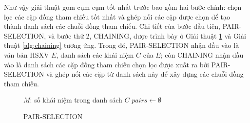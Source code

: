 Như vậy giải thuật gom cụm cụm tốt nhất trước bao gồm hai bước chính: chọn lọc các cặp đồng tham chiếu tốt nhất và ghép nối các cặp được chọn để tạo thành danh sách các chuỗi đồng tham chiếu. Chi tiết của bước đầu tiên, PAIR-SELECTION, và bước thứ 2, CHAINING, được trình bày ở Giải thuật \ref{alg:pair-selection} và Giải thuật \ref{alg:chaining} tương ứng. Trong đó, PAIR-SELECTION nhận đầu vào là văn bản HSXV $E$, danh sách các khái niệm $C$ của $E$; còn CHAINING nhận đầu vào là danh sách các cặp đồng tham chiếu chọn lọc được xuất ra bởi PAIR-SELECTION và ghép nối các cặp từ danh sách này để xây dựng các chuỗi đồng tham chiếu.

\begin{figure}[th]
\begin{algorithm}[H]
\caption{PAIR-SELECTION\label{alg:pair-selection}}

\BlankLine
$M$: số khái niệm trong danh sách $C$\;
$pairs \leftarrow \emptyset$\;
\BlankLine
{}
\;
\end{algorithm}
\end{figure}

